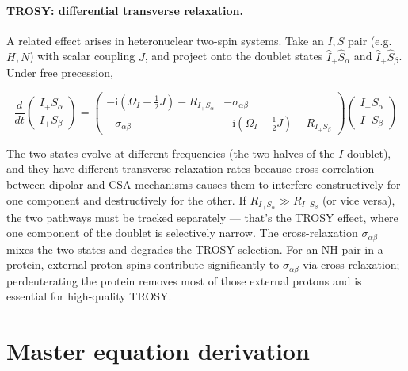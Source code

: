 \documentclass[notitlepage,11pt]{article}
\newcommand{\rmi}{\mathrm{i}}
\begin{document}
\paragraph{TROSY: differential transverse relaxation.} A related effect arises in heteronuclear two-spin systems. Take an $I,S$ pair (e.g.\ $H,N$) with scalar coupling $J$, and project onto the doublet states $\hat{I}_+\hat{S}_\alpha$ and $\hat{I}_+\hat{S}_\beta$. Under free precession,

\begin{equation}
  \frac{d}{dt}  \left(\begin{array}{c} I_+S_\alpha \\ I_+S_\beta \end{array} \right) = 
\left( \begin{array}{cc}  -\rmi (\Omega_I+ \frac{1}{2}J) - R_{I_+S_\alpha} & -\sigma_{\alpha\beta} \\ -\sigma_{\alpha\beta} &  -\rmi (\Omega_I-\frac{1}{2}J) -  R_{I_+S_\beta} \end{array}\right)
 \left(\begin{array}{c} I_+S_\alpha \\ I_+ S_\beta \end{array} \right)
  \end{equation}

The two states evolve at different frequencies (the two halves of the $I$ doublet), and they have different transverse relaxation rates because cross-correlation between dipolar and CSA mechanisms causes them to interfere constructively for one component and destructively for the other. If $R_{I_+S_\alpha}\gg R_{I_+S_\beta}$ (or vice versa), the two pathways must be tracked separately — that's the TROSY effect, where one component of the doublet is selectively narrow. The cross-relaxation $\sigma_{\alpha\beta}$ mixes the two states and degrades the TROSY selection. For an NH pair in a protein, external proton spins contribute significantly to $\sigma_{\alpha\beta}$ via cross-relaxation; perdeuterating the protein removes most of those external protons and is essential for high-quality TROSY.








    

\section{Master equation derivation}
\label{deriv}
\end{document}
